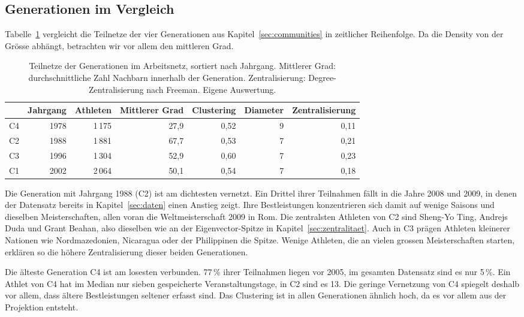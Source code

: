 \subsection{Generationen im Vergleich}
Tabelle~\ref{tab:generationen_kennzahlen} vergleicht die Teilnetze der vier
Generationen aus Kapitel~\ref{sec:communities} in zeitlicher Reihenfolge.
Da die Density von der Grösse abhängt, betrachten wir vor allem den
mittleren Grad.

\begin{table}[H]
  \centering
  \caption{Teilnetze der Generationen im Arbeitsnetz, sortiert nach Jahrgang.
  Mittlerer Grad: durchschnittliche Zahl Nachbarn innerhalb der Generation.
  Zentralisierung: Degree-Zentralisierung nach Freeman. Eigene Auswertung.}
  \label{tab:generationen_kennzahlen}
  \begin{tabular}{@{}lrrrrrr@{}}
    \toprule
    & Jahrgang & Athleten & Mittlerer Grad & Clustering & Diameter & Zentralisierung \\
    \midrule
    C4 & 1978 & 1\,175 & 27,9 & 0,52 & 9 & 0,11 \\
    C2 & 1988 & 1\,881 & 67,7 & 0,53 & 7 & 0,21 \\
    C3 & 1996 & 1\,304 & 52,9 & 0,60 & 7 & 0,23 \\
    C1 & 2002 & 2\,064 & 50,1 & 0,54 & 7 & 0,18 \\
    \bottomrule
  \end{tabular}
\end{table}

Die Generation mit Jahrgang 1988 (C2) ist am dichtesten vernetzt. Ein
Drittel ihrer Teilnahmen fällt in die Jahre 2008 und 2009, in denen der
Datensatz bereits in Kapitel~\ref{sec:daten} einen Anstieg zeigt. Ihre
Bestleistungen konzentrieren sich damit auf wenige Saisons und dieselben
Meisterschaften, allen voran die Weltmeisterschaft 2009 in Rom. Die
zentralsten Athleten von C2 sind Sheng-Yo Ting, Andrejs Duda und Grant
Beahan, also dieselben wie an der Eigenvector-Spitze in
Kapitel~\ref{sec:zentralitaet}. Auch in C3 prägen Athleten kleinerer
Nationen wie Nordmazedonien, Nicaragua oder der Philippinen die Spitze.
Wenige Athleten, die an vielen grossen Meisterschaften starten, erklären so
die höhere Zentralisierung dieser beiden Generationen.

Die älteste Generation C4 ist am losesten verbunden. 77\,\% ihrer
Teilnahmen liegen vor 2005, im gesamten Datensatz sind es nur 5\,\%. Ein
Athlet von C4 hat im Median nur sieben gespeicherte Veranstaltungstage, in
C2 sind es 13. Die geringe Vernetzung von C4 spiegelt deshalb vor allem,
dass ältere Bestleistungen seltener erfasst sind. Das Clustering ist in
allen Generationen ähnlich hoch, da es vor allem aus der Projektion
entsteht.

